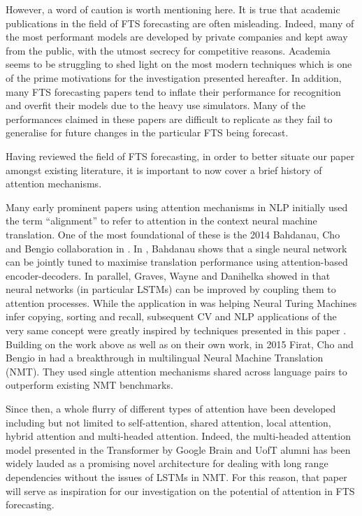 \documentclass{article}
\begin{document}
However, a word of caution is worth mentioning here. It is true that academic publications in the field of FTS forecasting are often misleading. Indeed, many of the most performant models are developed by private companies and kept away from the public, with the utmost secrecy for competitive reasons. Academia seems to be struggling to shed light on the most modern techniques which is one of the prime motivations for the investigation presented hereafter. In addition, many FTS forecasting papers tend to inflate their performance for recognition and overfit their models due to the heavy use simulators. Many of the performances claimed in these papers are difficult to replicate as they fail to generalise for future changes in the particular FTS being forecast.

Having reviewed the field of FTS forecasting, in order to better situate our paper amongst existing literature, it is important to now cover a brief history of attention mechanisms. 

Many early prominent papers using attention mechanisms in NLP initially used the term “alignment” to refer to attention in the context neural machine translation. One of the most foundational of these is the 2014 Bahdanau, Cho and Bengio collaboration in \cite{bahdanau2014neural}. In \cite{bahdanau2014neural}, Bahdanau shows that a single neural network can be jointly tuned to maximise translation performance using attention-based encoder-decoders. In parallel, Graves, Wayne and Danihelka showed in \cite{graves2014neural} that neural networks (in particular LSTMs) can be improved by coupling them to attention processes. While the application in \cite{graves2014neural} was helping Neural Turing Machines infer copying, sorting and recall, subsequent CV and NLP applications of the very same concept were greatly inspired by techniques presented in this paper \cite{xu2015show}. Building on the work above as well as on their own work, in 2015 Firat, Cho and Bengio in \cite{firat2016multi} had a breakthrough in multilingual Neural Machine Translation (NMT). They used single attention mechanisms shared across language pairs to outperform existing NMT benchmarks. 

Since then, a whole flurry of different types of attention have been developed including but not limited to self-attention, shared attention, local attention, hybrid attention and multi-headed attention. Indeed, the multi-headed attention model presented in the Transformer \cite{vaswani2017attention} by Google Brain and UofT alumni has been widely lauded as a promising novel architecture for dealing with long range dependencies without the issues of LSTMs in NMT. For this reason, that paper will serve as inspiration for our investigation on the potential of attention in FTS forecasting.
\end{document}
